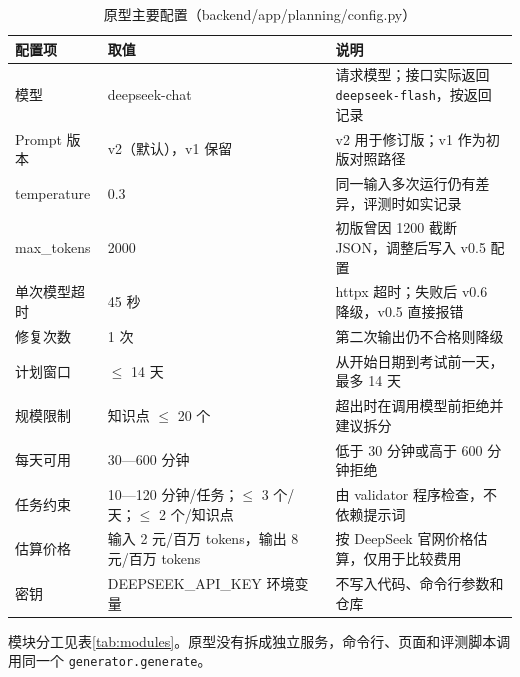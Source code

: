 \documentclass[UTF8,12pt,a4paper]{ctexart}
\begin{document}
\begin{table}[H]
\centering
\caption{原型主要配置（backend/app/planning/config.py）}
\label{tab:config}
\small
\begin{tabularx}{\textwidth}{L{3.4cm}L{3.2cm}X}
\toprule
配置项 & 取值 & 说明 \\
\midrule
模型 & deepseek-chat & 请求模型；接口实际返回 \texttt{deepseek-flash}，按返回记录 \\
Prompt 版本 & v2（默认），v1 保留 & v2 用于修订版；v1 作为初版对照路径 \\
temperature & 0.3 & 同一输入多次运行仍有差异，评测时如实记录 \\
max\_tokens & 2000 & 初版曾因 1200 截断 JSON，调整后写入 v0.5 配置 \\
单次模型超时 & 45 秒 & httpx 超时；失败后 v0.6 降级，v0.5 直接报错 \\
修复次数 & 1 次 & 第二次输出仍不合格则降级 \\
计划窗口 & $\le$ 14 天 & 从开始日期到考试前一天，最多 14 天 \\
规模限制 & 知识点 $\le$ 20 个 & 超出时在调用模型前拒绝并建议拆分 \\
每天可用 & 30—600 分钟 & 低于 30 分钟或高于 600 分钟拒绝 \\
任务约束 & 10—120 分钟/任务；$\le$ 3 个/天；$\le$ 2 个/知识点 & 由 validator 程序检查，不依赖提示词 \\
估算价格 & 输入 2 元/百万 tokens，输出 8 元/百万 tokens & 按 DeepSeek 官网价格估算，仅用于比较费用 \\
密钥 & DEEPSEEK\_API\_KEY 环境变量 & 不写入代码、命令行参数和仓库 \\
\bottomrule
\end{tabularx}
\end{table}

模块分工见表\ref{tab:modules}。原型没有拆成独立服务，命令行、页面和评测脚本调用同一个 \texttt{generator.generate}。
\end{document}

